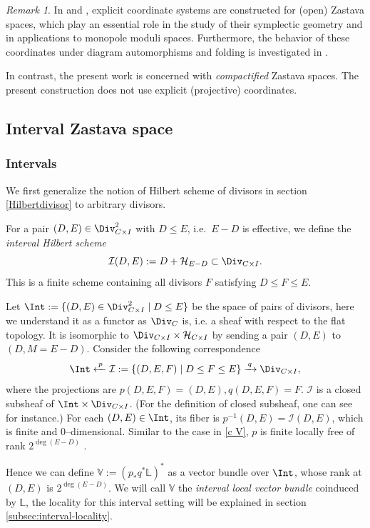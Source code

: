 \documentclass{amsart}
\numberwithin{equation}{section}
\numberwithin{figure}{section}
\theoremstyle{definition}
\theoremstyle{remark}
\newtheorem{rmk}[thm]{Remark}
\renewcommand{\c}[1]{\mathcal{#1}}
\renewcommand{\b}[1]{\mathbb{#1}}
\begin{document}
\begin{rmk}
	In \cite{finkelberg1999note} and \cite{braverman2016gaiotto}, explicit coordinate systems are constructed for (open) Zastava spaces, which play an essential role in the study of their symplectic geometry and in applications to monopole moduli spaces. 
	Furthermore, the behavior of these coordinates under diagram automorphisms and folding is investigated in 	\cite{nakajima2023coulomb}.
	
	In contrast, the present work is concerned with \emph{compactified} Zastava spaces. The present construction does not use explicit (projective) coordinates.
\end{rmk}



\subsection{Interval Zastava space}
\subsubsection{Intervals}

We first generalize the notion of Hilbert scheme of divisors in section \ref{Hilbertdivisor} to arbitrary divisors.

For a pair $(D,E)\in \Div_{C\times I}^2$ with $D\le E$, i.e.\ $E-D$ is 
effective, we define the \emph{interval Hilbert scheme}
\[\c I(D,E) := D +\c H_{E-D}\subset\Div_{C\times I}.\]
This is a finite scheme containing all divisors $F$ satisfying $D\le F\le E$.

Let
$\Int := \{(D,E)\in \Div_{C\times I}^2 \mid D\le E\}$
be the space of pairs of divisors, here we understand it as a functor as $\Div_C$ is, i.e. a sheaf with respect to the flat topology. It is isomorphic to $\Div_{C\times I}\times \c H_{C\times I}$ by sending a pair $(D,E)$ to $(D,M=E-D)$.
Consider the following correspondence 
\[
\Int \xleftarrow{\,p\,} 
\c I := \{(D,E,F)\mid D\le F\le E\}
\xrightarrow{\,q\,}
\Div_{C\times I},
\]
where the projections are 
$p(D,E,F)=(D,E), q(D,E,F)=F$. $\c I$ is a closed subsheaf of $\Int\times \Div_{C\times I}$. (For the definition of closed subsheaf, one can see \cite[Definition 2.11]{stromme1996elementary} for instance.) For each $(D,E)\in \Int$, its fiber is $p^{-1}(D,E)=\c I(D,E)$, which is finite and $0$--dimensional.  
Similar to the case in \ref{c V}, $p$ is finite locally free of rank $2^{\deg(E-D)}$ \cite[Lemma 2.4.2]{mirkovic2021loop}.

Hence we can define $\b V := (p_* q^* \mathbb L)^*$ as a vector bundle over $\Int$, whose rank at $(D,E)$ is $2^{\deg(E-D)}$.
We will call $\b V$ the \emph{interval local vector bundle} coinduced by $\b L$, the locality for this interval setting will be explained in section \ref{subsec:interval-locality}.
\end{document}
